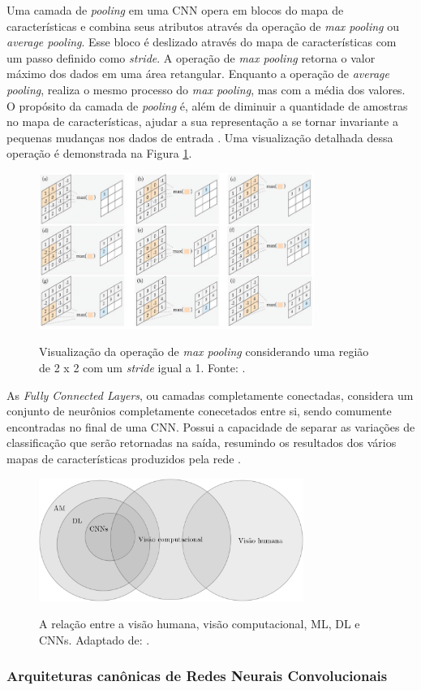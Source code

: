 Uma camada de \emph{pooling} em uma CNN opera em blocos do mapa de características e combina seus atributos através da operação de \emph{max pooling} ou \emph{average pooling}. Esse bloco é deslizado através do mapa de características com um passo definido como \emph{stride}. A operação de \emph{max pooling} retorna o valor máximo dos dados em uma área retangular. Enquanto a operação de \emph{average pooling}, realiza o mesmo processo do \emph{max pooling}, mas com a média dos valores. O propósito da camada de \emph{pooling} é, além de diminuir a quantidade de amostras no mapa de características, ajudar a sua representação a se tornar invariante a pequenas mudanças nos dados de entrada \cite{khan, goodfellow}. Uma visualização detalhada dessa operação é demonstrada na Figura \ref{fig:pooling}.

\begin{figure}[h!]
  \centering
  \caption{Visualização da operação de \emph{max pooling} considerando uma região de 2 x 2 com um \emph{stride} igual a 1. Fonte: \cite{khan}.}
  \includegraphics[width=0.8\textwidth]{imgs/pooling}
  \label{fig:pooling}
\end{figure}


As \emph{Fully Connected Layers}, ou camadas completamente conectadas, considera um conjunto de neurônios completamente conecetados entre si, sendo comumente encontradas no final de uma CNN. Possui a capacidade de separar as variações de classificação que serão retornadas na saída, resumindo os resultados dos vários mapas de características produzidos pela rede \cite{gulli}.



\begin{figure}[h!]
  \centering
  \caption{A relação entre a visão humana, visão computacional, ML, DL e CNNs. Adaptado de: \cite{khan}.}
  \includegraphics[height=4cm]{imgs/areas-ia}
  \label{fig:areas-ia}
\end{figure}


\subsubsection{Arquiteturas canônicas de Redes Neurais Convolucionais}
\label{subsubsec:arq-cnns}
